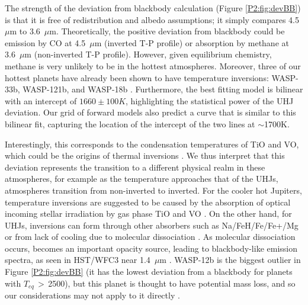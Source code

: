 The strength of the deviation from blackbody calculation (Figure \ref{P2:fig:devBB}) is that it is free of redistribution and albedo assumptions; it simply compares 4.5~$\mu$m to 3.6~$\mu$m. Theoretically, the positive deviation from blackbody could be emission by CO at 4.5~$\mu$m (inverted T-P profile) or absorption by methane at 3.6~$\mu$m (non-inverted T-P profile). However, given equilibrium chemistry, methane is very unlikely to be in the hottest atmospheres. Moreover, three of our hottest planets have already been shown to have temperature inversions: WASP-33b, WASP-121b, and WASP-18b \citep{Haynes2015, vonEssen2015, Evans2017, Arcangeli2018, Kreidberg2018b}. Furthermore, the best fitting model is bilinear with an intercept of $1660\pm100K$, highlighting the statistical power of the UHJ deviation. Our grid of forward models also predict a curve that is similar to this bilinear fit, capturing the location of the intercept of the two lines at $\sim$1700K.



Interestingly, this corresponds to the condensation temperatures of TiO and VO, which could be the origins of thermal inversions \citep{Hubeny2003, Burrows2007b, Fortney2008}. We thus interpret that this deviation represents the transition to a different physical realm in these atmospheres, for example as the temperature approaches that of the UHJs, atmospheres transition from  non-inverted to inverted. For the cooler hot Jupiters, temperature inversions are suggested to be caused by the absorption of optical incoming stellar irradiation by gas phase TiO and VO \citep{Hubeny2003, Fortney2008}. On the other hand, for UHJs, inversions can form through other absorbers such as Na/FeH/Fe/Fe+/Mg \citep[e.g][]{Lothringer2018, Pino2020} or from lack of cooling due to molecular dissociation \citep{Parmentier2018b}. As molecular dissociation occurs,  becomes an important opacity source, leading to blackbody-like emission spectra, as seen in HST/WFC3 near 1.4~$\mu$m \citep[e.g.,][]{Arcangeli2018}. WASP-12b is the biggest outlier in Figure \ref{P2:fig:devBB} (it has the lowest deviation from a blackbody for planets with $T_{eq}$\,$>$\,2500), but this planet is thought to have potential mass loss, and so our considerations may not apply to it directly \citep{Cowan2012a, Bell2019}.

